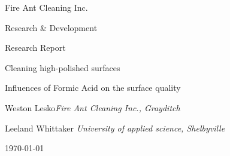 \documentclass{article}
\begin{document}
\begin{titlepage}
	\makeatletter
	\renewcommand{\thefootnote}{\@fnsymbol\c@footnote}
	\makeatother
	\setlength{\parindent}{0pt}
	{\large Fire Ant Cleaning Inc. \par
	Research \& Development\par}
	\vspace{15em}
{\large Research Report\par}
\vspace{\baselineskip}
{\LARGE Cleaning high-polished surfaces\par}
{\Large Influences of Formic Acid on the surface quality\par}
\vspace{3em}
\hfill\parbox{.9\linewidth}{%
	{Weston Lesko\footnotemark \itshape Fire Ant Cleaning Inc., Grayditch}\par
{Leeland Whittaker \itshape University of applied science, Shelbyville}\par
}\par
\vspace{4\baselineskip}
\today\par
{}
\end{titlepage}
\end{document}
